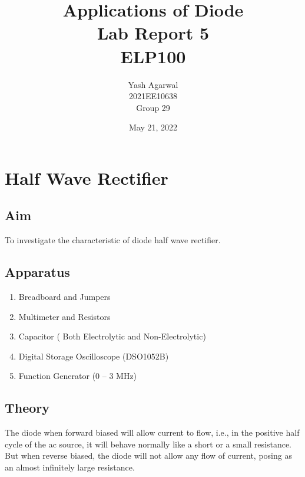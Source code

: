 \documentclass{article}
\title{Applications of Diode \\ Lab Report 5 \\ ELP100}
\author{Yash Agarwal \\ 2021EE10638 \\ Group 29}
\date{May 21, 2022}
\begin{document}
\pagecolor{yellow!15}
\maketitle
\vspace{15px}
\tableofcontents
{}
\newpage
\section{Half Wave Rectifier}
\subsection{Aim}
To investigate the characteristic of diode half wave rectifier.
\subsection{Apparatus}
\begin{enumerate}
\item Breadboard and Jumpers
\item Multimeter and Resistors
\item Capacitor ( Both Electrolytic and Non-Electrolytic)
\item Digital Storage Oscilloscope (DSO1052B)
\item Function Generator (0 – 3 MHz)
\end{enumerate}

\subsection{Theory}
\begin{figure}
\end{figure}
The diode when forward biased will allow current to flow, i.e., in the positive half cycle of the ac source, it will behave normally like a short or a small resistance. But when reverse biased, the diode will not allow any flow of current, posing as an almost infinitely large resistance. \\
\end{document}
